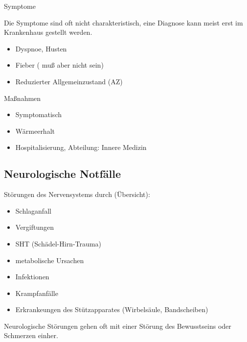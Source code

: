 \documentclass{article}
\begin{document}
Symptome

Die Symptome sind oft nicht charakteristisch, eine Diagnose kann meist
erst im Krankenhaus gestellt werden. 

\begin{itemize}
\item Dyspnoe, Husten

\item Fieber ( mu{\ss} aber nicht sein)

\item Reduzierter Allgemeinzustand (AZ)

\end{itemize}
Ma{\ss}nahmen

\begin{itemize}
\item Symptomatisch

\end{itemize}
\begin{itemize}
\item W\"armeerhalt 

\end{itemize}
\begin{itemize}
\item Hospitalisierung, Abteilung: Innere Medizin

\end{itemize}
\subsection{Neurologische Notf\"alle}
St\"orungen des Nervensystems durch (\"Ubersicht):

\begin{itemize}
\item Schlaganfall

\item Vergiftungen

\item SHT (Sch\"adel-Hirn-Trauma)

\item metabolische Ursachen

\item Infektionen

\item Krampfanf\"alle

\item Erkrankeungen des St\"utzapparates (Wirbels\"aule, Bandscheiben)

\end{itemize}
Neurologische St\"orungen gehen oft mit einer St\"orung des Bewusstseins
oder Schmerzen einher.
\end{document}
